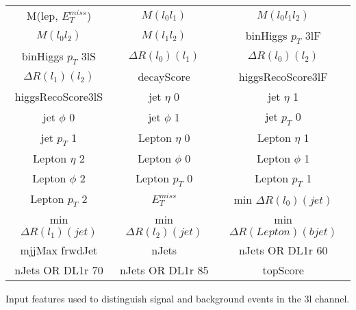   \begin{center}
  \begin{tabular}{ccc}
    \hline\hline
    M(lep, $E_T^{miss}$) & $M(l_0l_1)$ & $M(l_0l_1l_2)$ \\
    $M(l_0l_2)$ & $M(l_1l_2)$ & binHiggs $p_T$ 3lF \\
    binHiggs $p_T$ 3lS & $\Delta R(l_0)(l_1)$ & $\Delta R(l_0)(l_2)$ \\
    $\Delta R(l_1)(l_2)$ & decayScore & higgsRecoScore3lF \\
    higgsRecoScore3lS & jet  $\eta$ 0 & jet  $\eta$ 1 \\
    jet $\phi$ 0 & jet $\phi$ 1 & jet  $p_T$ 0 \\
    jet  $p_T$ 1 & Lepton  $\eta$ 0 & Lepton  $\eta$ 1 \\
    Lepton  $\eta$ 2 & Lepton $\phi$ 0 & Lepton $\phi$ 1 \\
    Lepton $\phi$ 2 & Lepton  $p_T$ 0 & Lepton  $p_T$ 1 \\
    Lepton  $p_T$ 2 & $E_T^{miss}$ & min $\Delta R(l_0)(jet)$ \\
    min $\Delta R(l_1)(jet)$ & min $\Delta R(l_2)(jet)$ & min $\Delta R(Lepton)(bjet)$ \\
    mjjMax frwdJet & nJets & nJets OR DL1r 60 \\
    nJets OR DL1r 70 & nJets OR DL1r 85 & topScore   \\
    \hline
  \end{tabular}
  \end{center}
  \caption{Input features used to distinguish signal and background events in the 3l channel.}
  \label{tab:sigBkg3lfeatures}
